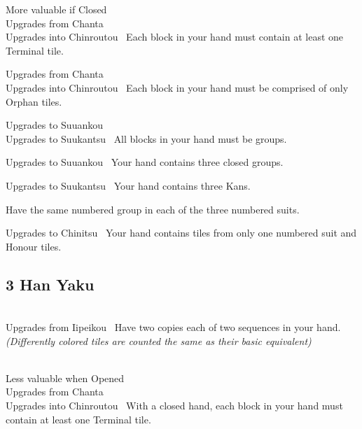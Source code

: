 	{\morevaluable More valuable if Closed~ \\ 
	\upgradesfrom Upgrades from Chanta~ \\
	\upgradesto Upgrades into Chinroutou~}
	{Each block in your hand must contain at least one Terminal tile.}

	{\upgradesfrom Upgrades from Chanta~ \\
	\upgradesto Upgrades into Chinroutou~}
	{Each block in your hand must be comprised of only Orphan tiles.}

	{\upgradesto Upgrades to Suuankou~\\
	\upgradesto Upgrades to Suukantsu~}
	{All blocks in your hand must be groups.}

	{\upgradesto Upgrades to Suuankou~}
	{Your hand contains three closed groups.}

	{\upgradesto Upgrades to Suukantsu~}
	{Your hand contains three Kans.}

	{}
	{Have the same numbered group in each of the three numbered suits.}

	{\upgradesto Upgrades to Chinitsu~}
	{Your hand contains tiles from only one numbered suit and Honour tiles.}


\subsection{3 Han Yaku}\label{core:ssec:3-han-yaku}

	{\closedhand \\ 
	\upgradesfrom Upgrades from Iipeikou~}
	{Have two copies each of two sequences in your hand. \textit{(Differently colored tiles are counted the same as their basic equivalent)}}

	{\closedhand \\ 
	\lessvaluable Less valuable when Opened~\\
	\upgradesfrom Upgrades from Chanta~ \\
	\upgradesto Upgrades into Chinroutou~}
	{With a closed hand, each block in your hand must contain at least one Terminal tile.}

